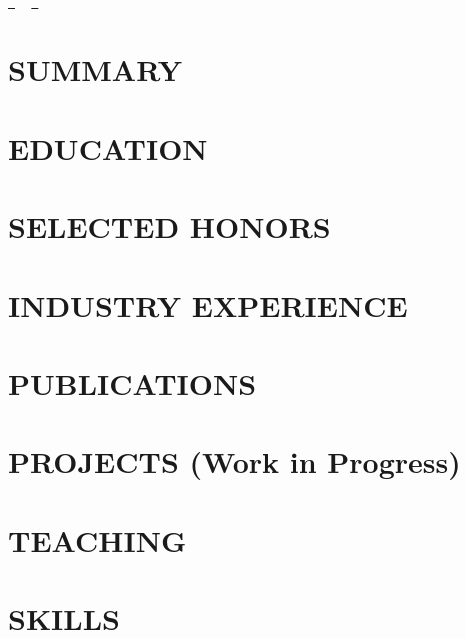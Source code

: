 \documentclass[letterpaper,11pt]{article}
\begin{document}
% 
\newpage

\begin{center}
    {\Huge\scshape \myName} 
    \\ 
    \vspace{5pt}
    \small
    \href{mailto:EMAIL}{\raisebox{-0.2\height}\faEnvelope\  \underline{\myEmail}} ~ 
    \href{https://\myWebsite}{\raisebox{-0.2\height}\faGithub\ \underline{\myWebsite}}
\end{center}

\section{SUMMARY}

\section{EDUCATION}

\section{SELECTED HONORS}
{
\small

}

\section{INDUSTRY EXPERIENCE}


\section{PUBLICATIONS}
\begin{enumerate}[leftmargin=0.25in, itemsep=0pt,label={[\arabic*]}]

\end{enumerate}
\section{PROJECTS (Work in Progress)}


\section{TEACHING}

\section{SKILLS}




 
\end{document}
